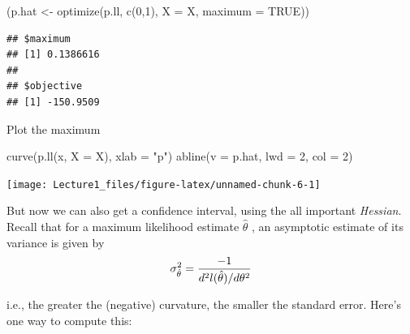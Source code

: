 \documentclass[]{tufte-handout}
\newenvironment{Shaded}{}{}
\newcommand{\AttributeTok}[1]{\textcolor[rgb]{0.49,0.56,0.16}{#1}}
\newcommand{\ConstantTok}[1]{\textcolor[rgb]{0.53,0.00,0.00}{#1}}
\newcommand{\DecValTok}[1]{\textcolor[rgb]{0.25,0.63,0.44}{#1}}
\newcommand{\FunctionTok}[1]{\textcolor[rgb]{0.02,0.16,0.49}{#1}}
\newcommand{\NormalTok}[1]{#1}
\newcommand{\OtherTok}[1]{\textcolor[rgb]{0.00,0.44,0.13}{#1}}
\newcommand{\SpecialCharTok}[1]{\textcolor[rgb]{0.25,0.44,0.63}{#1}}
\newcommand{\StringTok}[1]{\textcolor[rgb]{0.25,0.44,0.63}{#1}}
\begin{document}
\begin{Shaded}
\begin{Highlighting}[]
\NormalTok{(p.hat }\OtherTok{\textless{}{-}} \FunctionTok{optimize}\NormalTok{(p.ll, }\FunctionTok{c}\NormalTok{(}\DecValTok{0}\NormalTok{,}\DecValTok{1}\NormalTok{), }\AttributeTok{X =}\NormalTok{ X, }\AttributeTok{maximum =} \ConstantTok{TRUE}\NormalTok{))}
\end{Highlighting}
\end{Shaded}

\begin{verbatim}
## $maximum
## [1] 0.1386616
## 
## $objective
## [1] -150.9509
\end{verbatim}

Plot the maximum

\begin{Shaded}
\begin{Highlighting}[]
\FunctionTok{curve}\NormalTok{(}\FunctionTok{p.ll}\NormalTok{(x, }\AttributeTok{X =}\NormalTok{ X), }\AttributeTok{xlab =} \StringTok{"p"}\NormalTok{)}
\FunctionTok{abline}\NormalTok{(}\AttributeTok{v =}\NormalTok{ p.hat, }\AttributeTok{lwd =} \DecValTok{2}\NormalTok{, }\AttributeTok{col =} \DecValTok{2}\NormalTok{)}
\end{Highlighting}
\end{Shaded}

\texttt{[image: Lecture1\_files/figure-latex/unnamed-chunk-6-1]}

But now we can also get a confidence interval, using the all important
\emph{Hessian}. Recall that for a maximum likelihood estimate
\(\widehat{\theta}\) , an asymptotic estimate of its variance is given
by \[\sigma^2_{\hat\theta} = {-1\over d^2l(\hat\theta)/d\theta^2}\]

i.e., the greater the (negative) curvature, the smaller the standard
error. Here's one way to compute this:

\begin{Shaded}
\end{Shaded}
\end{document}
